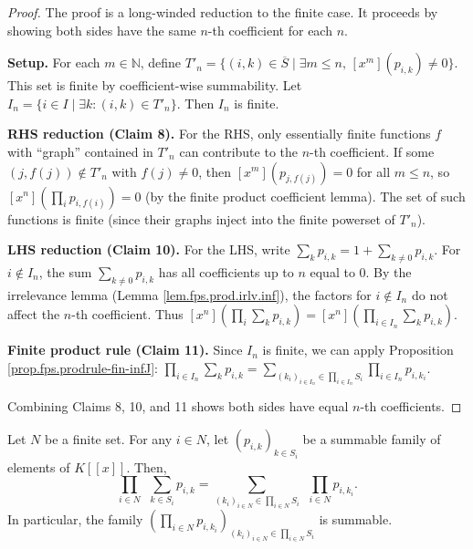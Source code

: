 \begin{proof}
The proof is a long-winded reduction to the finite case.
It proceeds by showing both sides have the same $n$-th coefficient for each $n$.

\textbf{Setup.} For each $m\in\mathbb{N}$, define
$T'_n = \{(i,k)\in\overline{S} \mid \exists m\le n,\, [x^m](p_{i,k})\ne 0\}$.
This set is finite by coefficient-wise summability.
Let $I_n = \{i \in I \mid \exists k: (i,k)\in T'_n\}$.
Then $I_n$ is finite.

\textbf{RHS reduction (Claim 8).}
For the RHS, only essentially finite functions $f$ with ``graph'' contained in $T'_n$
can contribute to the $n$-th coefficient. If some $(j, f(j))\notin T'_n$ with $f(j)\ne 0$,
then $[x^m](p_{j,f(j)}) = 0$ for all $m\le n$, so $[x^n](\prod_i p_{i,f(i)}) = 0$
(by the finite product coefficient lemma).
The set of such functions is finite
(since their graphs inject into the finite powerset of $T'_n$).

\textbf{LHS reduction (Claim 10).}
For the LHS, write $\sum_k p_{i,k} = 1 + \sum_{k\ne 0} p_{i,k}$.
For $i\notin I_n$, the sum $\sum_{k\ne 0} p_{i,k}$ has all coefficients
up to $n$ equal to $0$. By the irrelevance lemma (Lemma \ref{lem.fps.prod.irlv.inf}),
the factors for $i\notin I_n$ do not affect the $n$-th coefficient.
Thus $[x^n](\prod_i \sum_k p_{i,k}) = [x^n](\prod_{i\in I_n} \sum_k p_{i,k})$.

\textbf{Finite product rule (Claim 11).}
Since $I_n$ is finite, we can apply Proposition \ref{prop.fps.prodrule-fin-infJ}:
$\prod_{i\in I_n} \sum_k p_{i,k} = \sum_{(k_i)_{i\in I_n}\in\prod_{i\in I_n} S_i}
\prod_{i\in I_n} p_{i,k_i}$.

Combining Claims 8, 10, and 11 shows both sides have equal $n$-th coefficients.
\end{proof}

\begin{proposition}
\label{prop.fps.prodrule-fin-infJ}
\leantarget
\leanok
Let $N$ be a finite set. For any $i\in N$,
let $\left(  p_{i,k}\right)  _{k\in S_{i}}$ be a summable family of elements
of $K\left[  \left[  x\right]  \right]  $. Then,%
\begin{equation}
\prod_{i\in N}\ \ \sum_{k\in S_{i}}p_{i,k}=\sum_{\left(  k_{i}\right)  _{i\in
N}\in\prod_{i\in N}S_{i}}\ \ \prod_{i\in N}p_{i,k_{i}}.
\label{eq.lem.fps.prodrule-fin-infJ.eq}%
\end{equation}
In particular, the family $\left(  \prod_{i\in N}p_{i,k_{i}}\right)  _{\left(
k_{i}\right)  _{i\in N}\in\prod_{i\in N}S_{i}}$ is summable.
\end{proposition}

